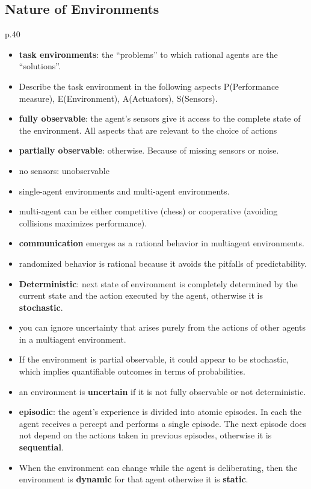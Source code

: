 \subsection{Nature of Environments}
p.40
\begin{itemize}[noitemsep,nolistsep]
	\item \textbf{task environments}: the “problems” to which rational agents are the “solutions”.
	\item Describe the task environment in the following aspects P(Performance measure), E(Environment), A(Actuators), S(Sensors).
	\item \textbf{fully observable}: the agent’s sensors give it access to the complete state of the environment. All aspects that are relevant to the choice of actions
	\item \textbf{partially observable}: otherwise. Because of missing sensors or noise.
	\item no sensors: unobservable
	\item single-agent environments and multi-agent environments.
	\item multi-agent can be either competitive (chess) or cooperative (avoiding collisions maximizes performance).
	\item \textbf{communication} emerges as a rational behavior in multiagent environments.
	\item randomized behavior is rational because it avoids the pitfalls of predictability.
	\item \textbf{Deterministic}: next state of environment is completely determined by the current state and the action executed by the agent, otherwise it is \textbf{stochastic}.
	\item you can ignore uncertainty that arises purely from the actions of other agents in a multiagent environment.
	\item If the environment is partial observable, it could appear to be stochastic, which implies quantifiable outcomes in terms of probabilities.
	\item an environment is \textbf{uncertain} if it is not fully observable or not deterministic. 
	\item \textbf{episodic}: the agent’s experience is divided into atomic episodes. In each the agent receives a percept and performs a single episode. The next episode does not depend on the actions taken in previous episodes, otherwise it is \textbf{sequential}.
	\item When the environment can change while the agent is deliberating, then the environment is \textbf{dynamic} for that agent otherwise it is \textbf{static}.

\end{itemize}
